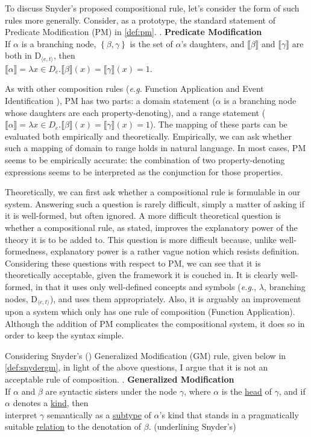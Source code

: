 \documentclass[MilwayThesis]{subfiles}
\begin{document}
To discuss Snyder's proposed compositional rule, let's consider the form of such rules more generally.
Consider, as a prototype, the standard statement of Predicate Modification (PM) in \ref{def:pm}.
\ex.\label{def:pm} \textbf{Predicate Modification} \parencite{heimkratzer1998semantics}\\
If $\alpha$ is a branching node, $\left\{ \beta,\gamma \right\}$ is the set of $\alpha$'s daughters, and $\llbracket\beta\rrbracket$ and $\llbracket\gamma\rrbracket$ are both in D$_{\langle e,t\rangle}$, then\\
$\llbracket\alpha\rrbracket = \lambda x \in D_e . \llbracket\beta\rrbracket(x) = \llbracket\gamma\rrbracket(x) = 1$.

As with other composition rules (\textit{e.g.} Function Application \parencite{heimkratzer1998semantics} and Event Identification \parencite{kratzer1996severing}), PM  has two parts: a domain statement ($\alpha$ is a branching node whose daughters are each property-denoting), and a range statement ($\llbracket\alpha\rrbracket = \lambda x \in D_e . \llbracket\beta\rrbracket(x) = \llbracket\gamma\rrbracket(x) = 1$).
The mapping of these parts can be evaluated both empirically and theoretically.
Empirically, we can ask whether such a mapping of domain to range holds in natural language.
In most cases, PM seems to be empirically accurate: the combination of two property-denoting expressions seems to be interpreted as the conjunction for those properties.

Theoretically, we can first ask whether a compositional rule is formulable in our system.
Answering such a question is rarely difficult, simply a matter of asking if it is well-formed, but often ignored.
A more difficult theoretical question is whether a compositional rule, as stated, improves the explanatory power of the theory it is to be added to.
This question is more difficult because, unlike well-formedness, explanatory power is a rather vague notion which resists definition.
Considering these questions with respect to PM, we can see that it is theoretically acceptable, given the framework it is couched in.
It is clearly well-formed, in that it uses only well-defined concepts and symbols (\textit{e.g.}, $\lambda$, branching nodes, D$_{\langle e,t\rangle}$), and uses them appropriately.
Also, it is arguably an improvement upon a system which only has one rule of composition (Function Application).
Although the addition of PM complicates the compositional system, it does so in order to keep the syntax simple.

Considering Snyder's (\citeyear{snyder2012parameter}) Generalized Modification (GM) rule, given below in \ref{def:snydergm}, in light of the above questions, I argue that it is not an acceptable rule of composition.
\ex. \textbf{Generalized Modification} \parencite{snyder2012parameter}\\
If $\alpha$ and $\beta$ are syntactic sisters under the node $\gamma$, where $\alpha$ is the \uline{head} of $\gamma$, and if $\alpha$ denotes a \uline{kind}, then\\
interpret $\gamma$ semantically as a \uline{subtype} of $\alpha$'s kind that stands in a pragmatically suitable \uline{relation} to the denotation of $\beta$. (underlining Snyder's)
\end{document}
